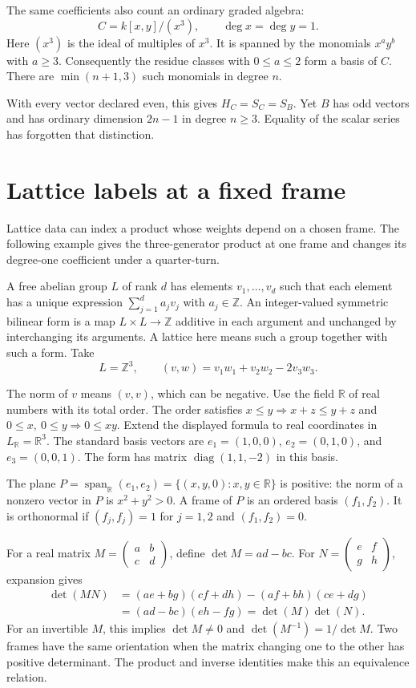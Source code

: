 The same coefficients also count an ordinary graded algebra:
\[
 C=k[x,y]/(x^3),\qquad\deg x=\deg y=1.
\]
Here $(x^3)$ is the ideal of multiples of $x^3$.
It is spanned by the monomials $x^a y^b$ with $a\geq3$.
Consequently the residue classes with $0\leq a\leq2$ form a basis of $C$.
There are $\min(n+1,3)$ such monomials in degree $n$.

With every vector declared even, this gives $H_C=S_C=S_B$.
Yet $B$ has odd vectors and has ordinary dimension $2n-1$ in degree
$n\geq3$. Equality of the scalar series has forgotten that distinction.

\section{Lattice labels at a fixed frame}

Lattice data can index a product whose weights depend on a chosen frame.
The following example gives the three-generator product at one frame and
changes its degree-one coefficient under a quarter-turn.

A free abelian group $L$ of rank $d$ has elements $v_1,\ldots,v_d$ such that
each element has a unique expression $\sum_{j=1}^d a_jv_j$ with
$a_j\in\mathbb Z$.
An integer-valued symmetric bilinear form is a map
$L\times L\to\mathbb Z$ additive in each argument and unchanged by
interchanging its arguments.
A lattice here means such a group together with such a form.
Take
\[
 L=\mathbb Z^3,\qquad
 (v,w)=v_1w_1+v_2w_2-2v_3w_3.
\]

The norm of $v$ means $(v,v)$, which can be negative.
Use the field $\mathbb R$ of real numbers with its total order.
The order satisfies $x\leq y\Rightarrow x+z\leq y+z$ and
$0\leq x,\ 0\leq y\Rightarrow0\leq xy$.
Extend the displayed formula to real coordinates in
$L_{\mathbb R}=\mathbb R^3$.
The standard basis vectors are $e_1=(1,0,0)$, $e_2=(0,1,0)$, and
$e_3=(0,0,1)$. The form has matrix $\operatorname{diag}(1,1,-2)$ in
this basis.

The plane
$P=\operatorname{span}_{\mathbb R}(e_1,e_2)=\{(x,y,0):x,y\in\mathbb R\}$
is positive: the norm of a nonzero vector in $P$ is $x^2+y^2>0$.
A frame of $P$ is an ordered basis $(f_1,f_2)$.
It is orthonormal if $(f_j,f_j)=1$ for $j=1,2$ and $(f_1,f_2)=0$.

For a real matrix $M=\left(\begin{smallmatrix}a&b\\c&d\end{smallmatrix}\right)$,
define $\det M=ad-bc$.
For $N=\left(\begin{smallmatrix}e&f\\g&h\end{smallmatrix}\right)$, expansion gives
\[
 \begin{aligned}
 \det(MN)
   &=(ae+bg)(cf+dh)-(af+bh)(ce+dg)\\
   &=(ad-bc)(eh-fg)=\det(M)\det(N).
 \end{aligned}
\]
For an invertible $M$, this implies $\det M\ne0$ and
$\det(M^{-1})=1/\det M$.
Two frames have the same orientation when the matrix changing one to the
other has positive determinant.
The product and inverse identities make this an equivalence relation.

